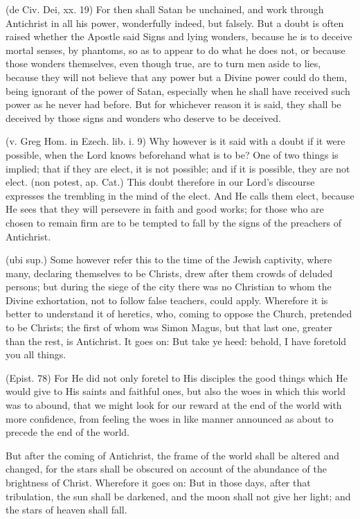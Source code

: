  (de Civ. Dei, xx. 19) For then shall Satan be unchained, and work through Antichrist in all his power, wonderfully indeed, but falsely. But a doubt is often raised whether the Apostle said Signs and lying wonders, because he is to deceive mortal senses, by phantoms, so as to appear to do what he does not, or because those wonders themselves, even though true, are to turn men aside to lies, because they will not believe that any power but a Divine power could do them, being ignorant of the power of Satan, especially when he shall have received such power as he never had before. But for whichever reason it is said, they shall be deceived by those signs and wonders who deserve to be deceived.

 (v. Greg Hom. in Ezech. lib. i. 9) Why however is it said with a doubt if it were possible, when the Lord knows beforehand what is to be? One of two things is implied; that if they are elect, it is not possible; and if it is possible, they are not elect. (non potest, ap. Cat.) This doubt therefore in our Lord’s discourse expresses the trembling in the mind of the elect. And He calls them elect, because He sees that they will persevere in faith and good works; for those who are chosen to remain firm are to be tempted to fall by the signs of the preachers of Antichrist.

 (ubi sup.) Some however refer this to the time of the Jewish captivity, where many, declaring themselves to be Christs, drew after them crowds of deluded persons; but during the siege of the city there was no Christian to whom the Divine exhortation, not to follow false teachers, could apply. Wherefore it is better to understand it of heretics, who, coming to oppose the Church, pretended to be Christs; the first of whom was Simon Magus, but that last one, greater than the rest, is Antichrist. It goes on: But take ye heed: behold, I have foretold you all things.

 (Epist. 78) For He did not only foretel to His disciples the good things which He would give to His saints and faithful ones, but also the woes in which this world was to abound, that we might look for our reward at the end of the world with more confidence, from feeling the woes in like manner announced as about to precede the end of the world.

 But after the coming of Antichrist, the frame of the world shall be altered and changed, for the stars shall be obscured on account of the abundance of the brightness of Christ. Wherefore it goes on: But in those days, after that tribulation, the sun shall be darkened, and the moon shall not give her light; and the stars of heaven shall fall.

